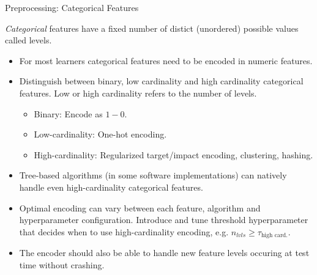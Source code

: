 	\begin{frame}{Preprocessing: Categorical Features}
	
	\textit{Categorical} features have a fixed number of distict (unordered) possible values called levels.  

	\vspace{0.5cm}

		\begin{itemize}
			\item For most learners categorical features need to be encoded in numeric features.
			\item Distinguish between binary, low cardinality and high cardinality categorical features. Low or high cardinality refers to the number of levels.
			\begin{itemize}
				\item Binary: Encode as $1-0$.
				\item Low-cardinality: One-hot encoding.
				\item High-cardinality: Regularized target/impact encoding, clustering, hashing.
			\end{itemize}
			\item Tree-based algorithms (in some software implementations) can natively handle even high-cardinality categorical features.
			\item Optimal encoding can vary between each feature, algorithm and hyperparameter configuration. Introduce and tune threshold hyperparameter that decides when to use high-cardinality encoding, e.g. $n_{lvls} \ge \tau_{\text{high card.}}$.
			\item The encoder should also be able to handle new feature levels occuring at test time without crashing. 
		\end{itemize}
	\end{frame}


